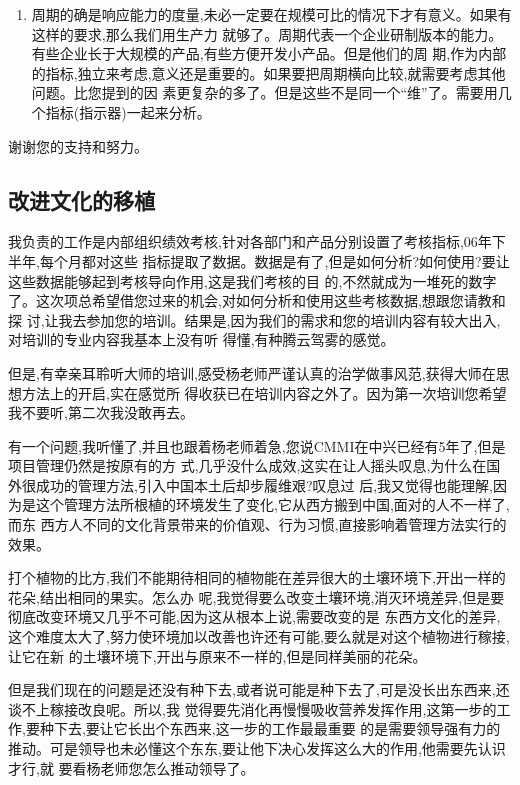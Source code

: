 \documentclass[11pt]{article}
\begin{document}
\begin{yang}
\begin{enumerate}
  \item 周期的确是响应能力的度量,未必一定要在规模可比的情况下才有意义。如果有这样的要求,那么我们用生产力
   就够了。周期代表一个企业研制版本的能力。有些企业长于大规模的产品,有些方便开发小产品。但是他们的周
   期,作为内部的指标,独立来考虑,意义还是重要的。如果要把周期横向比较,就需要考虑其他问题。比您提到的因
   素更复杂的多了。但是这些不是同一个``维''了。需要用几个指标(指示器)一起来分析。
\end{enumerate}
谢谢您的支持和努力。
\end{yang}

\subsection{改进文化的移植}

\begin{staff}
\slogo 我负责的工作是内部组织绩效考核,针对各部门和产品分别设置了考核指标,06年下半年,每个月都对这些
  指标提取了数据。数据是有了,但是如何分析?如何使用?要让这些数据能够起到考核导向作用,这是我们考核的目
  的,不然就成为一堆死的数字了。这次项总希望借您过来的机会,对如何分析和使用这些考核数据,想跟您请教和探
  讨,让我去参加您的培训。结果是,因为我们的需求和您的培训内容有较大出入,对培训的专业内容我基本上没有听
  得懂,有种腾云驾雾的感觉。

  但是,有幸亲耳聆听大师的培训,感受杨老师严谨认真的治学做事风范,获得大师在思想方法上的开启,实在感觉所
  得收获已在培训内容之外了。因为第一次培训您希望我不要听,第二次我没敢再去。

  有一个问题,我听懂了,并且也跟着杨老师着急,您说CMMI在中兴已经有5年了,但是项目管理仍然是按原有的方
  式,几乎没什么成效,这实在让人摇头叹息,为什么在国外很成功的管理方法,引入中国本土后却步履维艰?叹息过
  后,我又觉得也能理解,因为是这个管理方法所根植的环境发生了变化,它从西方搬到中国,面对的人不一样了,而东
  西方人不同的文化背景带来的价值观、行为习惯,直接影响着管理方法实行的效果。

  打个植物的比方,我们不能期待相同的植物能在差异很大的土壤环境下,开出一样的花朵,结出相同的果实。怎么办
  呢,我觉得要么改变土壤环境,消灭环境差异,但是要彻底改变环境又几乎不可能,因为这从根本上说,需要改变的是
  东西方文化的差异,这个难度太大了,努力使环境加以改善也许还有可能,要么就是对这个植物进行稼接,让它在新
  的土壤环境下,开出与原来不一样的,但是同样美丽的花朵。

  但是我们现在的问题是还没有种下去,或者说可能是种下去了,可是没长出东西来,还谈不上稼接改良呢。所以,我
  觉得要先消化再慢慢吸收营养发挥作用,这第一步的工作,要种下去,要让它长出个东西来,这一步的工作最最重要
  的是需要领导强有力的推动。可是领导也未必懂这个东东,要让他下决心发挥这么大的作用,他需要先认识才行,就
  要看杨老师您怎么推动领导了。


\end{staff}
\end{document}
